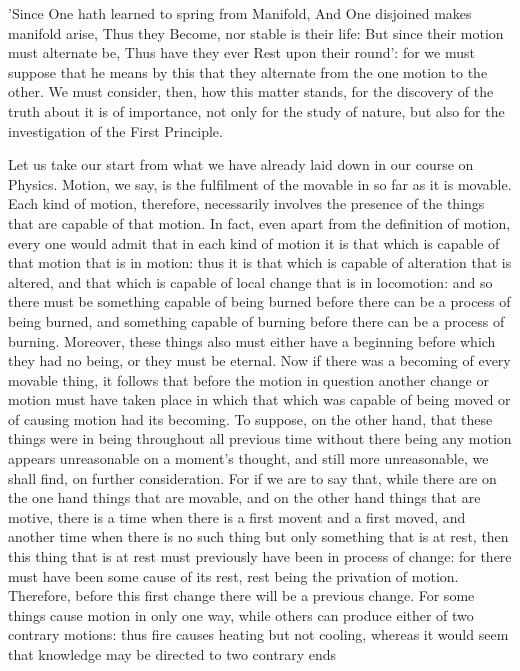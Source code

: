 'Since One hath learned to spring from Manifold, And One disjoined
makes manifold arise, Thus they Become, nor stable is their life:
But since their motion must alternate be, Thus have they ever Rest
upon their round': for we must suppose that he means by this that
they alternate from the one motion to the other. We must consider,
then, how this matter stands, for the discovery of the truth about
it is of importance, not only for the study of nature, but also for
the investigation of the First Principle. 

Let us take our start from what we have already laid down in our course
on Physics. Motion, we say, is the fulfilment of the movable in so
far as it is movable. Each kind of motion, therefore, necessarily
involves the presence of the things that are capable of that motion.
In fact, even apart from the definition of motion, every one would
admit that in each kind of motion it is that which is capable of that
motion that is in motion: thus it is that which is capable of alteration
that is altered, and that which is capable of local change that is
in locomotion: and so there must be something capable of being burned
before there can be a process of being burned, and something capable
of burning before there can be a process of burning. Moreover, these
things also must either have a beginning before which they had no
being, or they must be eternal. Now if there was a becoming of every
movable thing, it follows that before the motion in question another
change or motion must have taken place in which that which was capable
of being moved or of causing motion had its becoming. To suppose,
on the other hand, that these things were in being throughout all
previous time without there being any motion appears unreasonable
on a moment's thought, and still more unreasonable, we shall find,
on further consideration. For if we are to say that, while there are
on the one hand things that are movable, and on the other hand things
that are motive, there is a time when there is a first movent and
a first moved, and another time when there is no such thing but only
something that is at rest, then this thing that is at rest must previously
have been in process of change: for there must have been some cause
of its rest, rest being the privation of motion. Therefore, before
this first change there will be a previous change. For some things
cause motion in only one way, while others can produce either of two
contrary motions: thus fire causes heating but not cooling, whereas
it would seem that knowledge may be directed to two contrary ends
